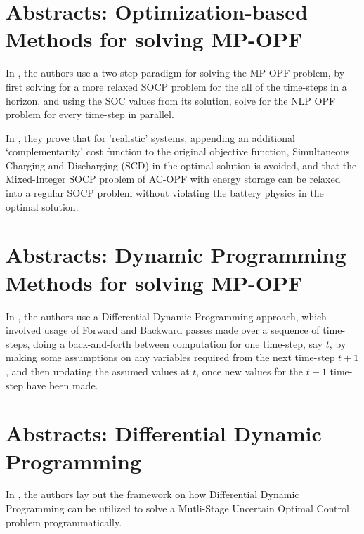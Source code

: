 \chapter{Abstracts: Optimization-based Methods for solving MP-OPF}
In \cite{Nazir2019Jun}, the authors use a two-step paradigm for solving the MP-OPF problem, by first solving for a more relaxed SOCP problem for the all of the time-steps in a horizon, and using the SOC values from its solution, solve for the NLP OPF problem for every time-step in parallel.

In \cite{Nazir2018Jun}, they prove that for 'realistic' systems, appending an additional `complementarity' cost function to the original objective function, Simultaneous Charging and Discharging (SCD) in the optimal solution is avoided, and that the Mixed-Integer SOCP problem of AC-OPF with energy storage can be relaxed into a regular SOCP problem without violating the battery physics in the optimal solution.

\chapter{Abstracts: Dynamic Programming Methods for solving MP-OPF}

In \cite{ddp_sugar_01}, the authors use a Differential Dynamic Programming approach, which involved usage of Forward and Backward passes made over a sequence of time-steps, doing a back-and-forth between computation for one time-step, say $t$, by making some assumptions on any variables required from the next time-step $t+1$, and then updating the assumed values at $t$, once new values for the $t+1$ time-step have been made.

\chapter{Abstracts: Differential Dynamic Programming}

In \cite{Qian2014Jul}, the authors lay out the framework on how Differential Dynamic Programming can be utilized to solve a Mutli-Stage Uncertain Optimal Control problem programmatically.